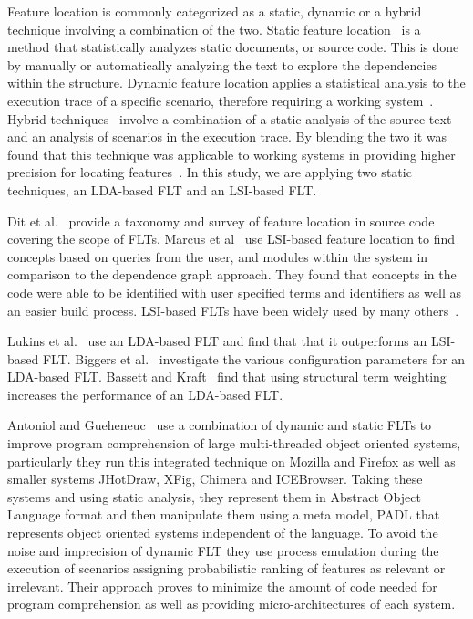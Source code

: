 Feature location is commonly categorized as a static, dynamic or a hybrid
technique involving a combination of the two. Static feature
location~\cite{Zhao-etal:2006} is a method that statistically analyzes
static documents, or source code. This is done by manually or automatically
analyzing the text to explore the dependencies within the structure. Dynamic
feature location applies a statistical analysis to the execution trace of a
specific scenario, therefore requiring a working system~\cite{Eisenbarth-etal:2001,Poshyvanyk-etal:2007}.
Hybrid techniques~\cite{Eisenbarth-etal:2003, Eaddy-etal:2008, Revelle-etal:2010} involve a combination of a static analysis of
the source text and an analysis of scenarios in the execution trace. By
blending the two it was found that this technique was applicable to working
systems in providing higher precision for locating features~\cite{Poshyvanyk-etal:2007,
Ernst:2004, Revelle-Coppitt:UNK}. In this study, we are applying two static
techniques, an LDA-based FLT and an LSI-based FLT.

Dit et al.~\cite{Dit-etal:2013b} provide a taxonomy and survey of feature
location in source code covering the scope of FLTs.  Marcus et
al~\cite{Marcus-etal:2004} use LSI-based feature location to find concepts based on
queries from the user, and modules within the system in comparison to the
dependence graph approach. They found that concepts in the code were able to be
identified with user specified terms and identifiers as well as an easier build
process. LSI-based FLTs have been widely used by many others~\cite{
Poshyvanyk-etal:2006, Poshyvanyk-Marcus:2007, Liu-etal:2007, Scanniello-Marcus:2011,
Eaddy-etal:2008, Cubranic-etal:2005}.

Lukins et al.~\cite{Lukins-etal:2008} use an LDA-based FLT and
find that that it outperforms an LSI-based FLT.
Biggers et al.~\cite{Biggers-etal:2014} investigate the various configuration
parameters for an LDA-based FLT.
Bassett and Kraft~\cite{Bassett-Kraft:2013} find that using structural
term weighting increases the performance of an LDA-based FLT.

Antoniol and Gueheneuc~\cite{Antoniol-Gueheneuc:2005, Antoniol-Gueheneuc:2006} use a combination of dynamic and
static FLTs to improve program comprehension of large multi-threaded
object oriented systems, particularly they run this integrated technique on
Mozilla and Firefox as well as smaller systems JHotDraw, XFig, Chimera and
ICEBrowser. Taking these systems and using static analysis, they represent them
in Abstract Object Language format and then manipulate them using a meta model,
PADL that represents object oriented systems independent of the language. To
avoid the noise and imprecision of dynamic FLT they use process emulation
during the execution of scenarios assigning probabilistic ranking of features as
relevant or irrelevant. Their approach proves to minimize the amount of code
needed for program comprehension as well as providing micro-architectures of
each system.

